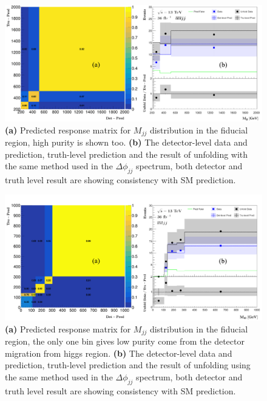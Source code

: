 \documentclass[12pt]{article}
\begin{document}
            \begin{figure}[ht]
                \begin{centering}
                \includegraphics[scale=0.108]{ps/mjj_redi.png}
                \caption{\textbf{(a)} Predicted response matrix for $M_{jj}$ distribution in the fiducial region, high purity is shown too. 
                \textbf{(b)} The detector-level data and prediction, truth-level prediction and the result of unfolding with the same method used in the $\Delta\phi_{jj}$ spectrum, both detector and truth level result are showing consistency with SM prediction.}
                \label{fig:mjjredi}
                \end{centering}
            \end{figure}
            \begin{figure}[ht]
                \begin{centering}
                \includegraphics[scale=0.108]{ps/m4l_redi.png}
                \caption{\textbf{(a)} Predicted response matrix for $M_{jj}$ distribution in the fiducial region, the only one bin gives low purity come from the detector migration from higgs region.
                \textbf{(b)} The detector-level data and prediction, truth-level prediction and the result of unfolding using the same method used in the $\Delta\phi_{jj}$ spectrum, both detector and truth level result are showing consistency with SM prediction.}
                \label{fig:m4lredi}
                \end{centering}
            \end{figure}
\end{document}
